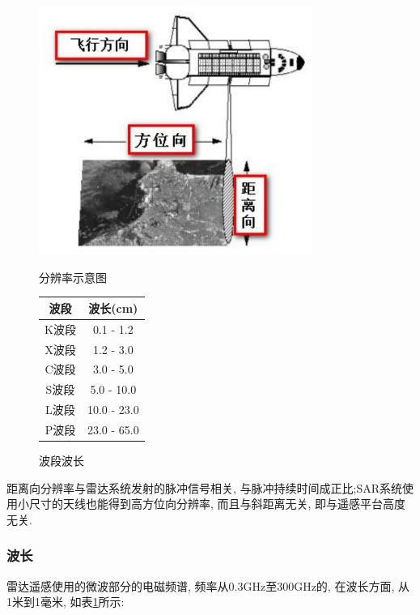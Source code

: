 \begin{figure}[htbp]
    \centering
    \begin{minipage}{0.4\textwidth}
        \centering
        \includegraphics[width=0.8\textwidth]{pic/chap01xx01.jpg}
        \caption{分辨率示意图}
        \label{fig:0101}
    \end{minipage}
    \qquad
    \begin{minipage}{0.4\textwidth}
        \centering
        \begin{tabular}{c c}
            \hline
            波段 &  波长(cm)     \\ \hline
            K波段 & 0.1 - 1.2     \\ \hline
            X波段 & 1.2 - 3.0     \\ \hline
            C波段 & 3.0 - 5.0     \\ \hline
            S波段 & 5.0 - 10.0    \\ \hline
            L波段 & 10.0 - 23.0   \\ \hline
            P波段 & 23.0 - 65.0   \\ \hline
        \end{tabular}
        \caption{波段波长}
        \label{tab:0101}
    \end{minipage}
\end{figure}

距离向分辨率与雷达系统发射的脉冲信号相关, 与脉冲持续时间成正比;SAR系统使用小尺寸的天线也能得到高方位向分辨率, 而且与斜距离无关, 即与遥感平台高度无关.

\subsubsection{波长}
雷达遥感使用的微波部分的电磁频谱, 频率从0.3GHz至300GHz的, 在波长方面, 从1米到1毫米, 如表\ref{tab:0101}所示:

